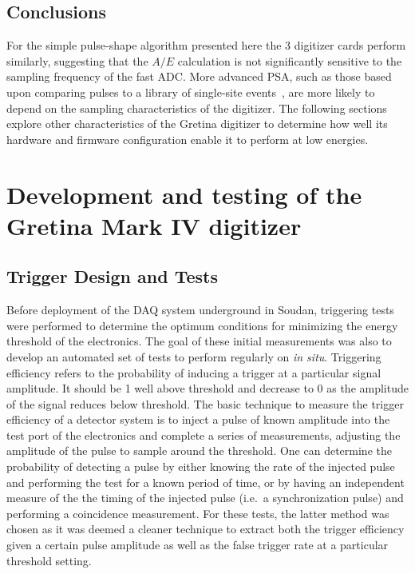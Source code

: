 		\subsection{Conclusions}
	     	\label{sec:HeadToHeadCompareConclusions}
		
	For the simple pulse-shape algorithm presented here the 3 digitizer cards perform similarly, suggesting that the $A/E$ calculation is not significantly sensitive to the sampling frequency of the fast ADC.  More advanced PSA, such as those based upon comparing pulses to a library of single-site events~\cite{Ren10}, are more likely to depend on the sampling characteristics of the digitizer.  The following sections explore other characteristics of the Gretina digitizer to determine how well its hardware and firmware configuration enable it to perform at low energies.
	

	\section{Development and testing of the Gretina Mark IV digitizer}
		\subsection{Trigger Design and Tests}
		\label{sec:DeploymentPPC2SoudanTriggerDesign}     
			
	Before deployment of the DAQ system underground in Soudan, triggering tests were performed to determine the optimum conditions for minimizing the energy threshold of the electronics.  The goal of these initial measurements was also to develop an automated set of tests to perform regularly on  \emph{in situ}.  Triggering efficiency refers to the probability of inducing a trigger at a particular signal amplitude.  It should be 1 well above threshold and decrease to 0 as the amplitude of the signal reduces below threshold.  The basic technique to measure the trigger efficiency of a detector system is to inject a pulse of known amplitude into the test port of the electronics and complete a series of measurements, adjusting the amplitude of the pulse to sample around the threshold.  One can determine the probability of detecting a pulse by either knowing the rate of the injected pulse and performing the test for a known period of time, or by having an independent measure of the the timing of the injected pulse (i.e.~a synchronization pulse) and performing a coincidence measurement.  For these tests, the latter method was chosen as it was deemed a cleaner technique to extract both the trigger efficiency given a certain pulse amplitude as well as the false trigger rate at a particular threshold setting.  
	
